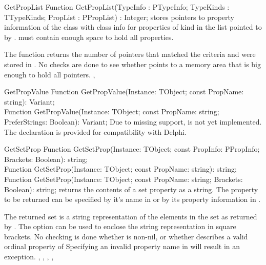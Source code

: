 
\begin{function}{GetPropList}
\Declaration
Function GetPropList(TypeInfo : PTypeInfo;
                     TypeKinds : TTypeKinds; 
                     PropList : PPropList) : Integer;
\Description
{} stores pointers to property information of the class with class
info  for properties of kind  in the list pointed to
by .  must contain enough space to hold all properties.

The function returns the number of pointers that matched the criteria and were stored
in .
\Errors
No checks are done to see whether  points to a memory area that is big enough
to hold all pointers.
\SeeAlso
{}, 
\end{function}


\begin{function}{GetPropValue}
\Declaration
Function GetPropValue(Instance: TObject; const PropName: string): Variant;\\
Function GetPropValue(Instance: TObject; const PropName: string; PreferStrings: Boolean): Variant;
\Description
Due to missing  support,  is not yet implemented. 
The declaration is provided for compatibility with Delphi.
\Errors
\SeeAlso
\end{function}

\begin{function}{GetSetProp}
\Declaration
Function GetSetProp(Instance: TObject; const PropInfo: PPropInfo; Brackets: Boolean):
string;\\
Function GetSetProp(Instance: TObject; const PropName: string): string;\\
Function GetSetProp(Instance: TObject; const PropName: string; Brackets: Boolean): string;                 
\Description
{} returns the contents of a set property as a string.
The property to be returned can be specified by it's name in 
or by its property information in .

The returned set is a string representation of the elements in the set as
returned by . The  option can be used to 
enclose the string representation in square brackets.
\Errors
No checking is done whether  is non-nil, or whether
 describes a valid ordinal property of 
Specifying an invalid property name in  will result in an
 exception.                                                 
\SeeAlso
{}, , ,
,
\end{function}

